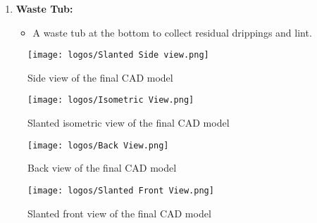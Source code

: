 \documentclass[table,french,english]{rapportCS}
\begin{document}
\begin{enumerate}[label=\arabic*.]
    \item \textbf{Waste Tub:}
    \begin{itemize}[label=$\bullet$]
        \item A waste tub at the bottom to collect residual drippings and lint.
    \end{itemize}

\end{enumerate}

\begin{figure}[h]
    \vspace{2cm}
    \centering
    \texttt{[image: logos/Slanted Side view.png]}
    \caption{Side view of the final CAD model}
    \label{fig:sideview}
\end{figure}
\begin{figure}[h]
    \centering
    \texttt{[image: logos/Isometric View.png]}
    \caption{Slanted isometric view of the final CAD model}
    \label{fig:isometricview}
\end{figure}
\begin{figure}[h]
    \centering
    \texttt{[image: logos/Back View.png]}
    \caption{Back view of the final CAD model}
    \label{fig:isometricview}
\end{figure}
\begin{figure}[h]
    \centering
    \texttt{[image: logos/Slanted Front View.png]}
    \caption{Slanted front view of the final CAD model}
    \label{fig:isometricview}
\end{figure}
\clearpage
\end{document}

